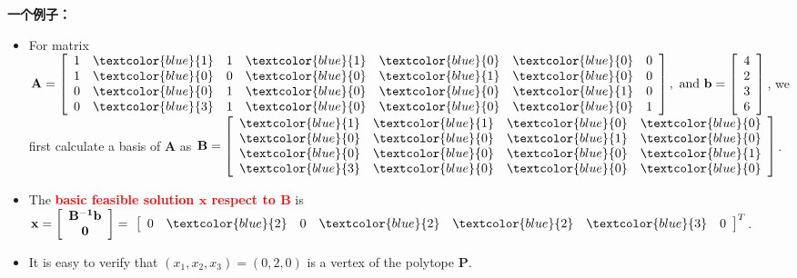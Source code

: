  \textbf{一个例子：}
 \begin{itemize}
\item
For matrix $\mathbf{A}=\left[
		\begin{array}{ccccccc}
		1 & \textcolor{blue}{1} & 1 & \textcolor{blue}{1} & \textcolor{blue}{0} & \textcolor{blue}{0} & 0 \\
		1 & \textcolor{blue}{0} & 0 & \textcolor{blue}{0} & \textcolor{blue}{1} & \textcolor{blue}{0} & 0 \\
		0 & \textcolor{blue}{0} & 1 & \textcolor{blue}{0} & \textcolor{blue}{0} & \textcolor{blue}{1} & 0 \\
		0 & \textcolor{blue}{3} & 1 & \textcolor{blue}{0} & \textcolor{blue}{0} & \textcolor{blue}{0} & 1
		\end{array}
		\right],
		 \text{ and } \mathbf{b} = \left[ \begin{array}{c}
						4\\
						2\\
						3\\
						6
					 	\end{array} \right]
$, we first calculate a basis of $\mathbf{A}$ as
 $\mathbf{B} = \left[
			\begin{array}{cccc}
		 \textcolor{blue}{1} &  \textcolor{blue}{1} & \textcolor{blue}{0} & \textcolor{blue}{0}  \\
		 \textcolor{blue}{0} &  \textcolor{blue}{0} & \textcolor{blue}{1} & \textcolor{blue}{0}  \\
		 \textcolor{blue}{0} &  \textcolor{blue}{0} & \textcolor{blue}{0} & \textcolor{blue}{1}  \\
		 \textcolor{blue}{3} &  \textcolor{blue}{0} & \textcolor{blue}{0} & \textcolor{blue}{0}
			\end{array}
			\right]$.
%
\item
The  \textcolor{red}{\bf basic feasible solution $\mathbf{x}$ respect to $\mathbf{B}$} is   $\mathbf{x=\left[\begin{array}{c}\mathbf{B^{-1}b}\\\mathbf{0}\end{array}\right]} = \ \left[ \begin{array}{ccccccc}
               0 &\textcolor{blue}{2} &0 &\textcolor{blue}{2} &\textcolor{blue}{2} &\textcolor{blue}{3} &0
               \end{array}
               \right]^T
$.
\item
It is easy to verify  that $(x_1, x_2, x_3) = (0, 2, 0)$ is a vertex of the polytope $\mathbf{P}$.
\end{itemize}




